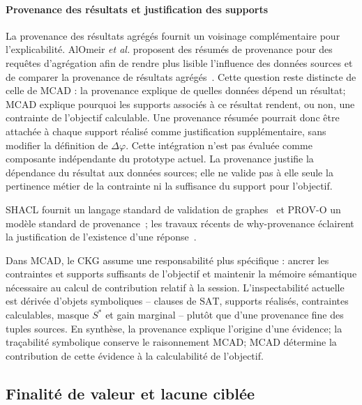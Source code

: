 \documentclass[journal]{IEEEtran}
\begin{document}
\paragraph*{Provenance des résultats et justification des supports}
La provenance des résultats agrégés fournit un voisinage complémentaire pour l'explicabilité. AlOmeir \emph{et al.} proposent des résumés de provenance pour des requêtes d'agrégation afin de rendre plus lisible l'influence des données sources et de comparer la provenance de résultats agrégés~\cite{AlOmeirLaiMilaniPottinger2023}. Cette question reste distincte de celle de MCAD : la provenance explique de quelles données dépend un résultat; MCAD explique pourquoi les supports associés à ce résultat rendent, ou non, une contrainte de l'objectif calculable. Une provenance résumée pourrait donc être attachée à chaque support réalisé comme justification supplémentaire, sans modifier la définition de $\Delta\varphi$. Cette intégration n'est pas évaluée comme composante indépendante du prototype actuel. La provenance justifie la dépendance du résultat aux données sources; elle ne valide pas à elle seule la pertinence métier de la contrainte ni la suffisance du support pour l'objectif.

SHACL fournit un langage standard de validation de graphes~\cite{W3CSHACL2017} et PROV-O un modèle standard de provenance~\cite{W3CPROVO2013}; les travaux récents de why-provenance éclairent la justification de l'existence d'une réponse~\cite{CalauttiEtAl2024}.

Dans MCAD, le CKG assume une responsabilité plus spécifique : ancrer les contraintes et supports suffisants de l'objectif et maintenir la mémoire sémantique nécessaire au calcul de contribution relatif à la session. L'inspectabilité actuelle est dérivée d'objets symboliques -- clauses de $\mathrm{SAT}$, supports réalisés, contraintes calculables, masque $S^*$ et gain marginal -- plutôt que d'une provenance fine des tuples sources. En synthèse, la provenance explique l'origine d'une évidence; la traçabilité symbolique conserve le raisonnement MCAD; MCAD détermine la contribution de cette évidence à la calculabilité de l'objectif.

\subsection{Finalité de valeur et lacune ciblée}
\end{document}
